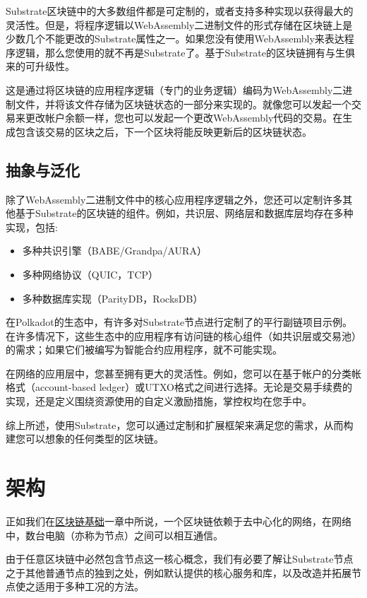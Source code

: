 Substrate区块链中的大多数组件都是可定制的，或者支持多种实现以获得最大的灵活性。但是，将程序逻辑以WebAssembly二进制文件的形式存储在区块链上是少数几个不能更改的Substrate属性之一。如果您没有使用WebAssembly来表达程序逻辑，那么您使用的就不再是Substrate了。基于Substrate的区块链拥有与生俱来的可升级性。

这是通过将区块链的应用程序逻辑（专门的业务逻辑）编码为WebAssembly二进制文件，并将该文件存储为区块链状态的一部分来实现的。就像您可以发起一个交易来更改帐户余额一样，您也可以发起一个更改WebAssembly代码的交易。在生成包含该交易的区块之后，下一个区块将能反映更新后的区块链状态。

\hypertarget{ux62bdux8c61ux4e0eux6cdbux5316}{%
\subsection{抽象与泛化}\label{ux62bdux8c61ux4e0eux6cdbux5316}}

除了WebAssembly二进制文件中的核心应用程序逻辑之外，您还可以定制许多其他基于Substrate的区块链的组件。例如，共识层、网络层和数据库层均存在多种实现，包括:

\begin{itemize}
\item
  多种共识引擎（BABE/Grandpa/AURA）
\item
  多种网络协议（QUIC，TCP）
\item
  多种数据库实现（ParityDB，RocksDB）
\end{itemize}

在Polkadot的生态中，有许多对Substrate节点进行定制了的平行副链项目示例。在许多情况下，这些生态中的应用程序有访问链的核心组件（如共识层或交易池）的需求；如果它们被编写为智能合约应用程序，就不可能实现。

在网络的应用层中，您甚至拥有更大的灵活性。例如，您可以在基于帐户的分类帐格式（account-based
ledger）或UTXO格式之间进行选择。无论是交易手续费的实现，还是定义围绕资源使用的自定义激励措施，掌控权均在您手中。

综上所述，使用Substrate，您可以通过定制和扩展框架来满足您的需求，从而构建您可以想象的任何类型的区块链。

\section{架构}

正如我们在\href{/fundamentals/blockchain-basics}{区块链基础}一章中所说，一个区块链依赖于去中心化的网络，在网络中，数台电脑（亦称为节点）之间可以相互通信。

由于任意区块链中必然包含节点这一核心概念，我们有必要了解让Substrate节点之于其他普通节点的独到之处，例如默认提供的核心服务和库，以及改造并拓展节点使之适用于多种工况的方法。

